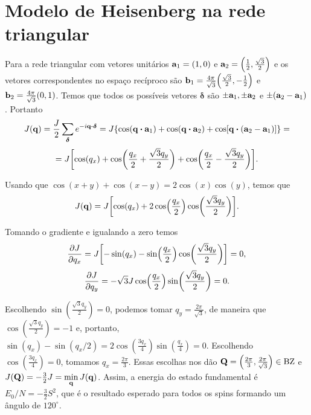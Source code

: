 \documentclass[a4paper,10pt]{article}
\begin{document}
\pagebreak

\section{Modelo de Heisenberg na rede triangular}

Para a rede triangular com vetores unitários $\vb{a}_1 = (1,0)$ e $\vb{a}_2 = \qty(\frac{1}{2}, \frac{\sqrt{3}}{2})$ e os vetores correspondentes no espaço recíproco são $\vb{b}_1 = \frac{4\pi}{\sqrt{3}} \qty(\frac{\sqrt{3}}{2}, -\frac{1}{2})$ e $\vb{b}_2 = \frac{4\pi}{\sqrt{3}} \qty(0, 1)$. Temos que todos os possíveis vetores $\bm{\delta}$ são $\pm\vb{a}_1, \pm\vb{a}_2$ e $\pm (\vb{a}_2 - \vb{a}_1)$. Portanto
$$
J(\q) = \frac{J}{2} \sum_{\bm{\delta}} e^{-i \q \vdot \bm{\delta}} =
J \qty{\cos(\q \vdot \vb{a}_1) + \cos(\q \vdot \vb{a}_2) + \cos[\q \vdot (\vb{a}_2 - \vb{a}_1)]} =
$$
$$
= J \qty[\cos(q_x) + \cos(\frac{q_x}{2} + \frac{\sqrt{3} q_y}{2}) + \cos(\frac{q_x}{2} - \frac{\sqrt{3} q_y}{2})].
$$

Usando que $\cos(x+y) + \cos(x-y) = 2 \cos(x) \cos(y)$, temos que
$$
J(\vb{q}) = J \qty[\cos(q_x) + 2 \cos(\frac{q_x}{2}) \cos(\frac{\sqrt{3} q_y}{2})].
$$

Tomando o gradiente e igualando a zero temos
$$
\pdv{J}{q_x} = J \qty[-\sin(q_x) - \sin(\frac{q_x}{2}) \cos(\frac{\sqrt{3} q_y}{2})] = 0,
$$
$$
\pdv{J}{q_y} = - \sqrt{3} J \cos(\frac{q_x}{2}) \sin(\frac{\sqrt{3} q_y}{2}) = 0.
$$

Escolhendo $\sin(\frac{\sqrt{3} q_y}{2}) = 0$, podemos tomar $q_y = \frac{2\pi}{\sqrt{3}}$, de maneira que $\cos(\frac{\sqrt{3} q_y}{2}) = -1$ e, portanto, $\sin(q_x) - \sin(q_x/2) = 2 \cos(\frac{3 q_x}{4}) \sin(\frac{q_x}{4}) = 0$. Escolhendo $\cos(\frac{3q_x}{4}) = 0$, tomamos $q_x = \frac{2\pi}{3}$. Essas escolhas nos dão $\vb{Q} = \qty(\frac{2\pi}{3}, \frac{2\pi}{\sqrt{3}}) \in \text{BZ}$ e $J(\vb{Q}) = -\frac{3}{2} J = \displaystyle{\min_{\vb{q}} J(\vb{q})}$. Assim, a energia do estado fundamental é $E_0 / N  = -\frac{3}{2} S^2$, que é o resultado esperado para todos os spins formando um ângulo de $120^\circ$.
\end{document}
